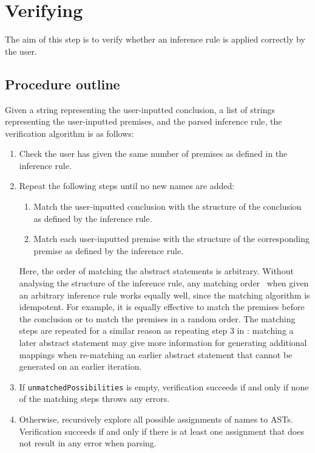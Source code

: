 \section{Verifying}
\label{checking:verifying}
The aim of this step is to verify whether an inference rule is applied correctly by the user.

\subsection{Procedure outline}
Given a string representing the user-inputted conclusion, a list of strings representing the user-inputted premises, and the parsed inference rule, the verification algorithm is as follows:
\begin{enumerate}
    \item Check the user has given the same number of premises as defined in the inference rule.
    \item Repeat the following steps until no new names are added:
    \begin{enumerate}
        \item Match the user-inputted conclusion with the structure of the conclusion as defined by the inference rule.
        \item Match each user-inputted premise with the structure of the corresponding premise as defined by the inference rule.
    \end{enumerate}
    Here, the order of matching the abstract statements is arbitrary. Without analysing the structure of the inference rule, any matching order~ when given an arbitrary inference rule works equally well, since the matching algorithm is idempotent. For example, it is equally effective to match the premises before the conclusion or to match the premises in a random order. The matching steps are repeated for a similar reason as repeating step 3 in : matching a later abstract statement may give more information for generating additional mappings when re-matching an earlier abstract statement that cannot be generated on an earlier iteration.
    \item If \lstinline{unmatchedPossibilities} is empty, verification succeeds if and only if none of the matching steps throws any errors.
    \item Otherwise, recursively explore all possible assignments of names to ASTs. Verification succeeds if and only if there is at least one assignment that does not result in any error when parsing.
\end{enumerate}